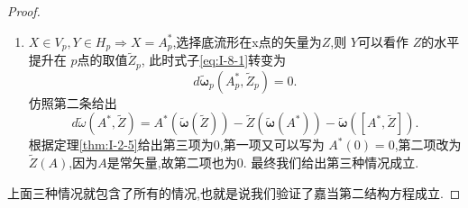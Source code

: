\documentclass[../main.tex]{subfiles}
\begin{document}
\begin{proof}
\begin{enumerate}
\begin{align*}
                       & = u(\omega(v)) - v(\omega(u)) -\omega_a(u(v^a) -  v(u^a))\\
                       & = u(\omega(v)) - v(\omega(u)) -\omega([u,v])
  .\end{align*}
  我们使用了导数算符的定义中的要求$u^a \nabla _a v = u(v)$,以及矢量场的对易子(李括号).
我们知道对于$\bm{} \tilde{\omega} \in \Lambda(1,\mathscr{G})$ 总可以写为\[
\bm{\tilde{\omega}} = e_r \tilde{\omega}^r 
.\] 
对于普通取值的形式场我们给出\[
  d \tilde{\omega}_p(A^*_p,B^*_p) = A^*_p(\tilde{\omega}(B^*_p)) - B^*_p(\tilde{\omega}(A^*_p)) -\tilde{\omega}([A^*_p,B^*_p])
.\] 
对两边同乘以$e_r$得 \[
  d \tilde{\bm{\omega}}_p(A^*_p,B^*_p) = e_rA^*_p(\tilde{\omega}(B^*_p)) - e_rB^*_p(\tilde{\omega}(A^*_p)) -\tilde{\bm{\omega}}([A^*_p,B^*_p])
.\]
 到目前为止我们还没有给过矢量作用于$\mathscr{G}$值的定义,我们这里进行补充
 \begin{definition}
   对于流形$M$上的矢量场 $X$,和 $F\in \Lambda_M(0,\mathscr{G})$定义
      \[X(F) := dF(X).\]
 \end{definition}
我们补充一个定理
\begin{theorem}
  {}{BI-8-1} 设$X$是流形 $M$上得一个矢量场, $e_r$是李代数 $\mathscr{G}$的基矢量,$f$是流形上的标量场.有\[
  e_rX(f) = X(e_r f)
  .\] 
\end{theorem}
\begin{proof}
  令$F \equiv e_r f \in \Lambda(0,\mathscr{G})$,只需下式对$\forall p\in M$成立即可\[
  e_rX_p(f) = X_p(F)
.\] 
我们来看
\begin{align*}
  e_rX_p(f) = e_r df|_p (X_p) = dF|_p (X_p) = X_p(F)
.\end{align*}
第一个等号就是对偶矢量场的定义.
\end{proof}
最后我们可以给出\[
   = A^*_p(\tilde{\bm{ \omega}}(B^*_p)) - B^*_p(\tilde{\bm{ \omega}}(A^*_p)) -\tilde{\bm{\omega}}([A^*_p,B^*_p])
.\] 
 根据联络定义\ref{def:联络-2}第一条给出$\forall p \in P$,$\bm{\tilde{\omega}}(B^*)_p  = B $是一个常数,而矢量作用于常数给出0,故最后给出
\[
  d \tilde{\bm{\omega}}_p(A^*_p,B^*_p) = -\tilde{\bm{\omega}}([A^*_p,B^*_p]) = - \bm{\tilde{\omega}}([A,B]^*_p)  = -[A,B]_p
.\] 
第二个等号见定理\ref{thm:I-1-8}.
\item $X \in V_p, Y \in H_p \Rightarrow X = A^*_p$,选择底流形在x点的矢量为$Z$,则 $Y$可以看作 $Z$的水平提升在 $p$点的取值$\tilde{Z}_p$,
  此时式子\ref{eq:I-8-1}转变为\[
  d\bm{\tilde{\omega}}_p(A^*_p,\tilde{Z}_p) = 0 
  .\] 
  仿照第二条给出\[
    d\tilde{\omega}(A^*,\tilde{Z}) = A^*(\tilde{\bm{\omega} }(\tilde{Z})) -  \tilde{Z}(\tilde{\bm{\omega} }(A^*)) - \bm{\tilde{\omega}}([A^*,\tilde{Z}]) 
  .\] 
  根据定理\ref{thm:I-2-5}给出第三项为$0$,第一项又可以写为 $A^*(0) = 0$,第二项改为 $\tilde{Z}(A)$,因为$A$是常矢量,故第二项也为0.
  最终我们给出第三种情况成立.
\end{enumerate}
上面三种情况就包含了所有的情况,也就是说我们验证了嘉当第二结构方程成立.
\end{proof}
\end{document}
